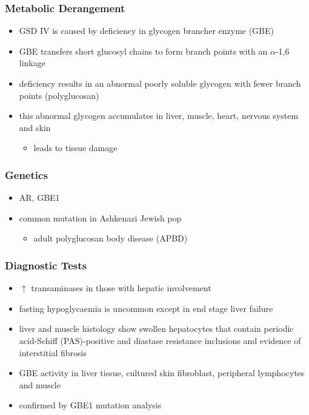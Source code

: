 \documentclass{scrartcl}
\begin{document}
\subsubsection{Metabolic Derangement}
\label{sec:org725db18}
\begin{itemize}
\item GSD IV is caused by deficiency in glycogen brancher enzyme (GBE)
\item GBE transfers short glucosyl chains to form branch points with an
\(\alpha\)-1,6 linkage
\item deficiency results in an abnormal poorly soluble glycogen with fewer branch points (polyglucosan)
\item this abnormal glycogen accumulates in liver, muscle, heart, nervous system and skin
\begin{itemize}
\item leads to tissue damage
\end{itemize}
\end{itemize}

\subsubsection{Genetics}
\label{sec:orgeb465bb}
\begin{itemize}
\item AR, GBE1
\item common mutation in Ashkenazi Jewish pop
\begin{itemize}
\item adult polyglucosan body disease (APBD)
\end{itemize}
\end{itemize}

\subsubsection{Diagnostic Tests}
\label{sec:orgc0aebfb}

\begin{itemize}
\item \(\uparrow\) transaminases in those with hepatic involvement
\item fasting hypoglycaemia is uncommon except in end stage liver failure
\item liver and muscle histology show swollen hepatocytes that contain
periodic acid-Schiff (PAS)-positive and diastase resistance
inclusions and evidence of interstitial fibrosis
\item GBE activity in liver tissue, cultured skin fibroblast, peripheral
lymphocytes and muscle
\item confirmed by GBE1 mutation analysis
\end{itemize}
\end{document}
